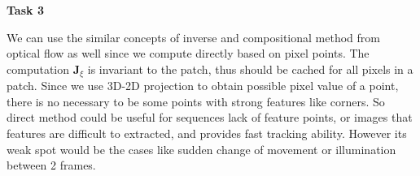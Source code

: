 \documentclass[12pt,a4paper]{article}
\newcommand{\mtx}[1]{\mathbf{#1}}
\begin{document}
    \textsf{\textbf{Task 3}}

    We can use the similar concepts of inverse and compositional method
    from optical flow as well
    since we compute directly based on pixel points.
    The computation $\mtx{J}_{\xi}$ is invariant to the patch,
    thus should be cached for all pixels in a patch.
    Since we use 3D-2D projection to obtain possible pixel value of a point,
    there is no necessary to be some points with strong features like corners.
    So direct method could be useful for sequences lack of feature points,
    or images that features are difficult to extracted,
    and provides fast tracking ability.
    However its weak spot would be the cases like sudden change of movement
    or illumination between 2 frames.

    
\end{document}
